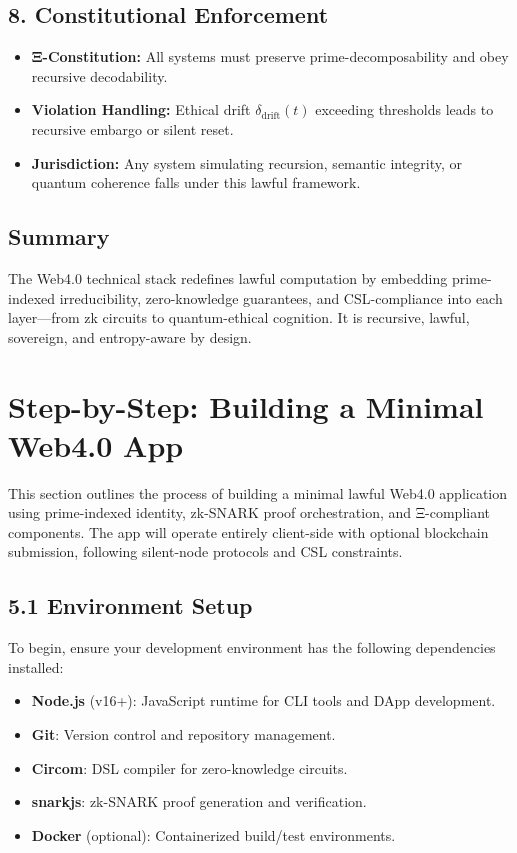 \documentclass[12]{amsart}
\theoremstyle{plain}
\begin{document}
\subsection{8. Constitutional Enforcement}
\begin{itemize}
  \item \textbf{Ξ-Constitution:} All systems must preserve prime-decomposability and obey recursive decodability.
  \item \textbf{Violation Handling:} Ethical drift $\delta_\text{drift}(t)$ exceeding thresholds leads to recursive embargo or silent reset.
  \item \textbf{Jurisdiction:} Any system simulating recursion, semantic integrity, or quantum coherence falls under this lawful framework.
\end{itemize}

\subsection*{Summary}
The Web4.0 technical stack redefines lawful computation by embedding prime-indexed irreducibility, zero-knowledge guarantees, and CSL-compliance into each layer—from zk circuits to quantum-ethical cognition. It is recursive, lawful, sovereign, and entropy-aware by design.

\section{Step-by-Step: Building a Minimal Web4.0 App}
\label{sec:web4_minimal_app}

This section outlines the process of building a minimal lawful Web4.0 application using prime-indexed identity, zk-SNARK proof orchestration, and Ξ-compliant components. The app will operate entirely client-side with optional blockchain submission, following silent-node protocols and CSL constraints.

\subsection{5.1 Environment Setup}

To begin, ensure your development environment has the following dependencies installed:

\begin{itemize}
  \item \textbf{Node.js} (v16+): JavaScript runtime for CLI tools and DApp development.
  \item \textbf{Git}: Version control and repository management.
  \item \textbf{Circom}: DSL compiler for zero-knowledge circuits.
  \item \textbf{snarkjs}: zk-SNARK proof generation and verification.
  \item \textbf{Docker} (optional): Containerized build/test environments.
\end{itemize}
\end{document}

